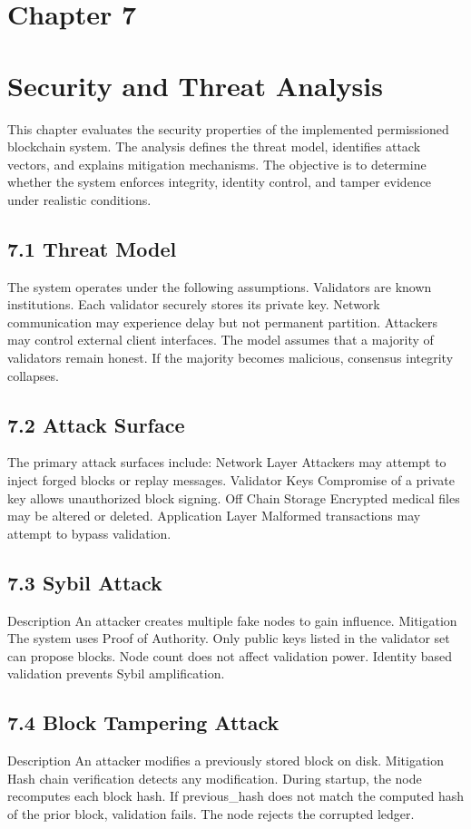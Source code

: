 \newpage
\section*{Chapter 7}
\label{ch:7}
\section*{Security and Threat Analysis}

This chapter evaluates the security properties of the implemented permissioned blockchain system. The analysis defines the threat model, identifies attack vectors, and explains mitigation mechanisms. The objective is to determine whether the system enforces integrity, identity control, and tamper evidence under realistic conditions.

\subsection*{7.1 Threat Model}
The system operates under the following assumptions.
Validators are known institutions.
Each validator securely stores its private key.
Network communication may experience delay but not permanent partition.
Attackers may control external client interfaces.
The model assumes that a majority of validators remain honest. If the majority becomes malicious, consensus integrity collapses.

\subsection*{7.2 Attack Surface}
The primary attack surfaces include:
Network Layer
Attackers may attempt to inject forged blocks or replay messages.
Validator Keys
Compromise of a private key allows unauthorized block signing.
Off Chain Storage
Encrypted medical files may be altered or deleted.
Application Layer
Malformed transactions may attempt to bypass validation.

\subsection*{7.3 Sybil Attack}
Description
An attacker creates multiple fake nodes to gain influence.
Mitigation
The system uses Proof of Authority. Only public keys listed in the validator set can propose blocks. Node count does not affect validation power. Identity based validation prevents Sybil amplification.

\subsection*{7.4 Block Tampering Attack}
Description
An attacker modifies a previously stored block on disk.
Mitigation
Hash chain verification detects any modification. During startup, the node recomputes each block hash. If previous_hash does not match the computed hash of the prior block, validation fails. The node rejects the corrupted ledger.

